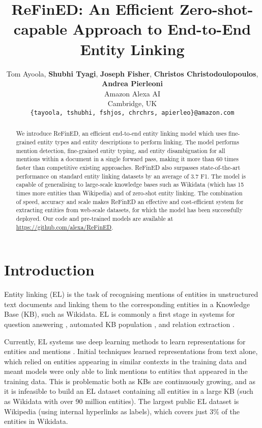 \documentclass[11pt]{article}
\title{ReFinED: An Efficient Zero-shot-capable Approach to End-to-End Entity Linking}
\author{Tom Ayoola, {\bf Shubhi Tyagi},
        {\bf Joseph Fisher}, {\bf Christos Christodoulopoulos}, {\bf Andrea Pierleoni} \\
        Amazon Alexa AI \\
        Cambridge, UK \\
        \texttt{\{tayoola, tshubhi, fshjos, chrchrs, apierleo\}@amazon.com}}
\begin{document}
\maketitle
\begin{abstract}
We introduce ReFinED, an efficient end-to-end entity linking model which uses fine-grained entity types and entity descriptions to perform linking. The model performs mention detection, fine-grained entity typing, and entity disambiguation for all mentions within a document in a single forward pass, making it more than 60 times faster than competitive existing approaches. ReFinED also surpasses state-of-the-art performance on standard entity linking datasets by an average of 3.7 F1. The model is capable of generalising to large-scale knowledge bases such as Wikidata (which has 15 times more entities than Wikipedia) and of zero-shot entity linking. The combination of speed, accuracy and scale makes ReFinED an effective and cost-efficient system for extracting entities from web-scale datasets, for which the model has been successfully deployed. Our code and pre-trained models are available at \href{https://github.com/alexa/ReFinED}{https://github.com/alexa/ReFinED}.
\end{abstract}

\section{Introduction}
Entity linking (EL) is the task of recognising mentions of entities in unstructured text documents and linking them to the corresponding entities in a Knowledge Base (KB), such as Wikidata. EL is commonly a first stage in systems for question answering \citep{wang-etal-2021-retrieval}, automated KB population \citep{hoffmann-etal-2011-knowledge}, and relation extraction \citep{baldini-soares-etal-2019-matching}.



Currently, EL systems use deep learning methods to learn representations for entities and mentions \citep{ganea-hofmann-2017-deep, le-titov-2018-improving}. Initial techniques learned representations from text alone, which relied on entities appearing in similar contexts in the training data and meant models were only able to link mentions to entities that appeared in the training data. This is problematic both as KBs are continuously growing, and as it is infeasible to build an EL dataset containing all entities in a large KB (such as Wikidata with over 90 million entities). The largest public EL dataset is Wikipedia (using internal hyperlinks as labels), which covers just 3\% of the entities in Wikidata.
\end{document}
